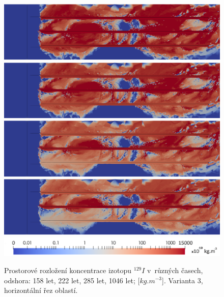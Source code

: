 \documentclass[11pt,a4paper]{article}
\begin{document}
\begin{onehalfspacing}
\begin{figure}[H]
\centering
\includegraphics[width=16cm]{graphics/obr_ralek/var3/08_158y.png}
\includegraphics[width=16cm]{graphics/obr_ralek/var3/09_222y.png}
\includegraphics[width=16cm]{graphics/obr_ralek/var3/10_285y.png}
\includegraphics[width=16cm]{graphics/obr_ralek/var3/13_1046y.png}
\includegraphics[width=16cm]{graphics/obr_ralek/var3/skala_nek_zdroj_vypnuti.png}
\caption{Prostorové rozložení koncentrace izotopu $^{129}I$ v~různých časech, odshora: 158 let, 222 let, 285 let, 1046 let; [$kg.m^{-3}$]. Varianta 3, horizontální řez oblastí.}
\label{nek_zdroj_vyp_02}
\end{figure}

\end{onehalfspacing} 
\end{document}
